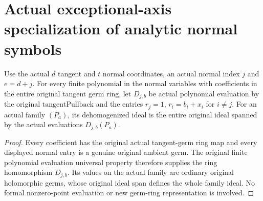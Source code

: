 \section{Actual exceptional-axis specialization of analytic normal symbols}

\begin{definition}
\label{hir:actual-normal-dehomogenized-polynomial-family-ideal}
Use the actual $d$ tangent and $t$ normal coordinates, an actual
normal index $j$ and $e=d+j$. For every finite polynomial in the
normal variables with coefficients in the entire original tangent
germ ring, let $D_{j,b}$ be actual polynomial evaluation by the
original $\mathrm{tangentPullback}$ and the entries
$r_j=1$, $r_i=b_i+x_i$ for $i\ne j$.
For an actual family $(P_a)$, its dehomogenized ideal is the entire
original ideal spanned by the actual evaluations $D_{j,b}(P_a)$.
\leanok
\end{definition}
\begin{proof}
Every coefficient has the original actual tangent-germ ring map and
every displayed normal entry is a genuine original ambient germ.
The original finite polynomial evaluation universal property therefore
supplies the ring homomorphism $D_{j,b}$. Its values on the actual
family are ordinary original holomorphic germs, whose original ideal
span defines the whole family ideal. No formal nonzero-point
evaluation or new germ-ring representation is involved.
\end{proof}

